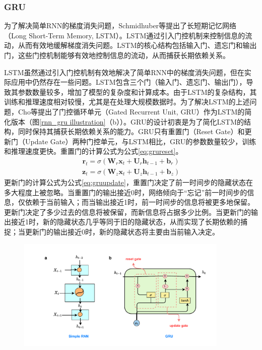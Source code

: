 \subsubsection{GRU}
为了解决简单RNN的梯度消失问题，Schmidhuber等提出了长短期记忆网络（Long Short-Term Memory, LSTM）\cite{schmidhuber1997long}。LSTM通过引入门控机制来控制信息的流动，从而有效地缓解梯度消失问题。LSTM的核心结构包括输入门、遗忘门和输出门，这些门控机制能够有效地控制信息的流动，从而捕获长期依赖关系。

LSTM虽然通过引入门控机制有效地解决了简单RNN中的梯度消失问题，但在实际应用中仍然存在一些问题。LSTM包含三个门（输入门、遗忘门、输出门），导致其参数数量较多，增加了模型的复杂度和计算成本。由于LSTM的复杂结构，其训练和推理速度相对较慢，尤其是在处理大规模数据时。为了解决LSTM的上述问题，Cho等提出了门控循环单元（Gated Recurrent Unit, GRU）作为LSTM的简化版本\cite{choLearningPhraseRepresentations2014}（图\ref{rnn_gru illustration}（b））。GRU的设计初衷是为了简化LSTM的结构，同时保持其捕获长期依赖关系的能力。GRU只有重置门（Reset Gate）和更新门（Update Gate）两种门控单元，与LSTM相比，GRU的参数数量较少，训练和推理速度更快。重置门的计算公式为公式\eqref{eq:grureset}。
\begin{align}
  \mathbf{r}_t = \sigma(\mathbf{W}_r \mathbf{x}_t + \mathbf{U}_r \mathbf{h}_{t-1} + \mathbf{b}_r) \label{eq:grureset}
\end{align}
\begin{align}
  \mathbf{z}_t = \sigma(\mathbf{W}_z \mathbf{x}_t + \mathbf{U}_z \mathbf{h}_{t-1} + \mathbf{b}_z) \label{eq:gruupdate}
\end{align}
更新门的计算公式为公式\eqref{eq:gruupdate}，重置门决定了前一时间步的隐藏状态在多大程度上被忽略。当重置门的输出接近0时，网络倾向于“忘记”前一时间步的信息，仅依赖于当前输入；而当输出接近1时，前一时间步的信息将被更多地保留。
更新门决定了多少过去的信息将被保留，而新信息将占据多少比例。当更新门的输出接近1时，新的隐藏状态几乎等同于旧的隐藏状态，从而实现了长期依赖的捕捉；当更新门的输出接近0时，新的隐藏状态将主要由当前输入决定。
\begin{figure}[htbp]
  \centering
  \includegraphics[width=0.9\textwidth]{Fig/rnn-gru.pdf}
\end{figure}

